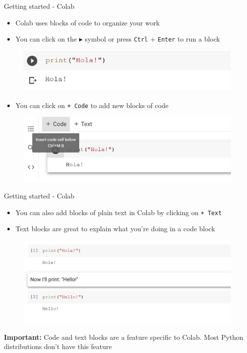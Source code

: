 \documentclass[aspectratio=169]{beamer}
\begin{document}
\begin{frame}{Getting started - Colab}

	\begin{itemize}
		\item Colab uses  blocks of code to organize your work
		\item You can click on the $\blacktriangleright$ symbol or press \texttt{Ctrl} + \texttt{Enter} to run a block
	\end{itemize}

	\begin{figure}
		\centering
		\includegraphics[width=0.6\linewidth]{img/block_of_code.png}
	\end{figure}

	\begin{itemize}
		\item You can click on \texttt{+ Code} to add new blocks of code
	\end{itemize}

	\begin{figure}
		\centering
		\includegraphics[width=0.6\linewidth]{img/add_code.png}
	\end{figure}

\end{frame}

\begin{frame}{Getting started - Colab}

	\begin{itemize}
		\item You can also add blocks of plain text in Colab by clicking on \texttt{+ Text}
		\item Text blocks are great to explain what you're doing in a code block
	\end{itemize}

	\begin{figure}
		\centering
		\includegraphics[width=0.6\linewidth]{img/text_block_between_code_blocks.png}
	\end{figure}

	\textbf{Important:} Code and text blocks are a feature specific to Colab. Most Python distributions don't have this feature

\end{frame}
\end{document}
